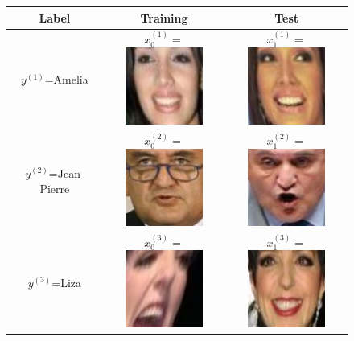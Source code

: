 \documentclass[twoside,11pt]{article}
\begin{document}
\begin{figure}[t]
\centering
\begin{tabular}{|c|c|c|}
\hline
Label & Training & Test\\ \hline
$y^{(1)}$=Amelia &
  $x_0^{(1)} = $\includegraphics[scale = 0.2]{face_photos/Amelia_Vega_0001.png} &
  $x_1^{(1)} = $\includegraphics[scale = 0.2]{face_photos/Amelia_Vega_0004.png} \\ \hline
$y^{(2)}$=Jean-Pierre &
  $x_0^{(2)} = $\includegraphics[scale = 0.2]{face_photos/Jean-Pierre_Raffarin_0001.png} &
  $x_1^{(2)} = $\includegraphics[scale = 0.2]{face_photos/Jean-Pierre_Raffarin_0004.png} \\ \hline
$y^{(3)}$=Liza &
  $x_0^{(3)} = $\includegraphics[scale = 0.2]{face_photos/Liza_Minnelli_0001.png} &
  $x_1^{(3)} = $\includegraphics[scale = 0.2]{face_photos/Liza_Minnelli_0004.png} \\ \hline

\end{tabular}
\end{figure}
\end{document}
